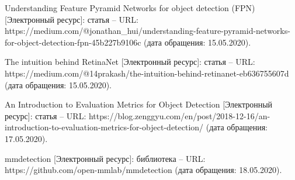 \begin{thebibliography}{9}
	Understanding Feature Pyramid Networks for object detection (FPN) [Электронный ресурс]: статья – URL: https://medium.com/@jonathan\_hui/understanding-feature-pyramid-networks-for-object-detection-fpn-45b227b9106c (дата обращения: 15.05.2020).
	
	The intuition behind RetinaNet [Электронный ресурс]: статья – URL: https://medium.com/@14prakash/the-intuition-behind-retinanet-eb636755607d (дата обращения: 15.05.2020).
	
	An Introduction to Evaluation Metrics for Object Detection [Электронный ресурс]: статья – URL: https://blog.zenggyu.com/en/post/2018-12-16/an-introduction-to-evaluation-metrics-for-object-detection/ (дата обращения: 17.05.2020).
	
	mmdetection [Электронный ресурс]: библиотека – URL: https://github.com/open-mmlab/mmdetection (дата обращения: 18.05.2020).
\end{thebibliography}
